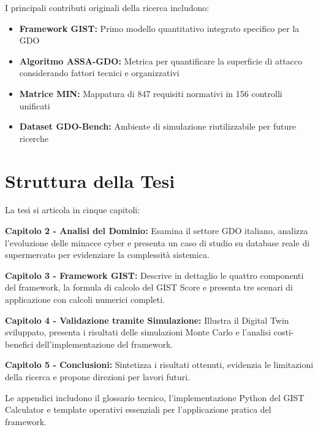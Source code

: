 I principali contributi originali della ricerca includono:

\begin{itemize}
\item \textbf{Framework GIST:} Primo modello quantitativo integrato specifico per la GDO
\item \textbf{Algoritmo ASSA-GDO:} Metrica per quantificare la superficie di attacco considerando fattori tecnici e organizzativi
\item \textbf{Matrice MIN:} Mappatura di 847 requisiti normativi in 156 controlli unificati
\item \textbf{Dataset GDO-Bench:} Ambiente di simulazione riutilizzabile per future ricerche
\end{itemize}

\section{Struttura della Tesi}
\label{sec:struttura}

La tesi si articola in cinque capitoli:

\textbf{Capitolo 2 - Analisi del Dominio:} Esamina il settore GDO italiano, analizza l'evoluzione delle minacce cyber e presenta un caso di studio su database reale di supermercato per evidenziare la complessità sistemica.

\textbf{Capitolo 3 - Framework GIST:} Descrive in dettaglio le quattro componenti del framework, la formula di calcolo del GIST Score e presenta tre scenari di applicazione con calcoli numerici completi.

\textbf{Capitolo 4 - Validazione tramite Simulazione:} Illustra il Digital Twin sviluppato, presenta i risultati delle simulazioni Monte Carlo e l'analisi costi-benefici dell'implementazione del framework.

\textbf{Capitolo 5 - Conclusioni:} Sintetizza i risultati ottenuti, evidenzia le limitazioni della ricerca e propone direzioni per lavori futuri.

Le appendici includono il glossario tecnico, l'implementazione Python del GIST Calculator e template operativi essenziali per l'applicazione pratica del framework.